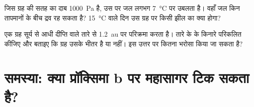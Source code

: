 \begin{exercise}[$\star\star\star$]\label{exo:g10:habitable-planet:14}
जिस ग्रह की सतह का दाब \qty{1000}{Pa} है, उस पर जल लगभग
\qty{7}{\degreeCelsius} पर उबलता है। वहाँ जल किन तापमानों के बीच द्रव रह सकता है?
\qty{15}{\degreeCelsius} वाले दिन उस ग्रह पर किसी झील का क्या
होगा?
\end{exercise}

\begin{exercise}[$\star\star\star$]\label{exo:g10:habitable-planet:15}
एक ग्रह सूर्य से आधी दीप्ति वाले तारे से \qty{1.2}{au} पर परिक्रमा करता है।
तारे के  के किनारे परिकलित कीजिए और बताइए कि ग्रह उसके भीतर है या नहीं।
इस उत्तर पर कितना भरोसा किया जा सकता है?
\end{exercise}

\section{समस्या: क्या प्रॉक्सिमा b पर महासागर टिक सकता है?}

